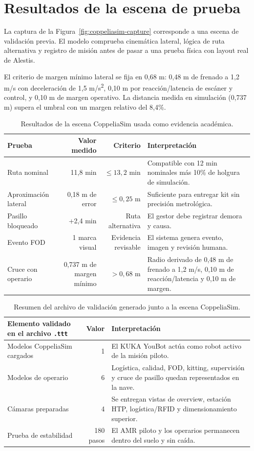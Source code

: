 \section{Resultados de la escena de prueba}

La captura de la Figura~\ref{fig:coppeliasim-capture} corresponde a una escena de validación previa. El modelo comprueba cinemática lateral, lógica de ruta alternativa y registro de misión antes de pasar a una prueba física con layout real de Alestis.

El criterio de margen mínimo lateral se fija en 0,68 m: 0,48 m de frenado a 1,2 m/s con deceleración de 1,5 m/s\textsuperscript{2}, 0,10 m por reacción/latencia de escáner y control, y 0,10 m de margen operativo. La distancia medida en simulación (0,737 m) supera el umbral con un margen relativo del 8,4\%.

\begin{table}[H]
\centering
\begin{tabularx}{\textwidth}{P{0.22\textwidth}r r X}
\toprule
Prueba & Valor medido & Criterio & Interpretación\\
\midrule
Ruta nominal & 11,8 min & \(\leq 13,2\) min & Compatible con 12 min nominales más 10\% de holgura de simulación.\\
Aproximación lateral & 0,18 m de error & \(\leq 0,25\) m & Suficiente para entregar kit sin precisión metrológica.\\
Pasillo bloqueado & +2,4 min & Ruta alternativa & El gestor debe registrar demora y causa.\\
Evento FOD & 1 marca visual & Evidencia revisable & El sistema genera evento, imagen y revisión humana.\\
Cruce con operario & 0,737 m de margen mínimo & \(>0,68\) m & Radio derivado de 0,48 m de frenado a 1,2 m/s, 0,10 m de reacción/latencia y 0,10 m de margen.\\
\bottomrule
\end{tabularx}
\caption{Resultados de la escena CoppeliaSim usada como evidencia académica.}
\label{tab:resultados-coppeliasim}
\end{table}

\begin{table}[H]
\centering
\begin{tabularx}{0.92\textwidth}{P{0.34\textwidth}rX}
\toprule
Elemento validado en el archivo \texttt{.ttt} & Valor & Interpretación\\
\midrule
Modelos CoppeliaSim cargados & 1 & El KUKA YouBot actúa como robot activo de la misión piloto.\\
Modelos de operario & 6 & Logística, calidad, FOD, kitting, supervisión y cruce de pasillo quedan representados en la nave.\\
Cámaras preparadas & 4 & Se entregan vistas de overview, estación HTP, logística/RFID y dimensionamiento superior.\\
Prueba de estabilidad & 180 pasos & El AMR piloto y los operarios permanecen dentro del suelo y sin caída.\\
\bottomrule
\end{tabularx}
\caption{Resumen del archivo de validación generado junto a la escena CoppeliaSim.}
\label{tab:validacion-ttt}
\end{table}

